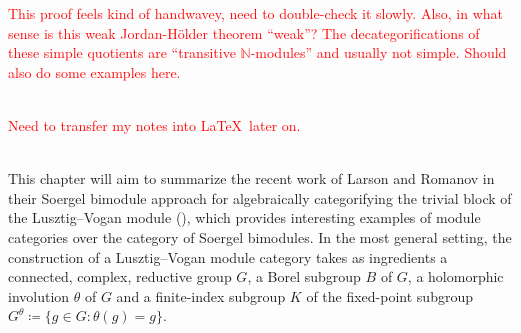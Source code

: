 \noindent\textcolor{red}{This proof feels kind of handwavey, need to double-check it slowly. Also, in what sense is this weak Jordan-H\"{o}lder theorem ``weak''? The decategorifications of these simple quotients are ``transitive $\mathbb{N}$-modules'' and usually not simple. Should also do some examples here.}\\
\newpage

\noindent\\ \textcolor{red}{Need to transfer my notes into \LaTeX\ later on.}
\newpage

\noindent\\ This chapter will aim to summarize the recent work of Larson and Romanov in their Soergel bimodule approach for algebraically categorifying the trivial block of the Lusztig--Vogan module (\cite{LR22}), which provides interesting examples of module categories over the category of Soergel bimodules. In the most general setting, the construction of a Lusztig--Vogan module category takes as ingredients a connected, complex, reductive group $G$, a Borel subgroup $B$ of $G$, a holomorphic involution $\theta$ of $G$ and a finite-index subgroup $K$ of the fixed-point subgroup $G^\theta \coloneqq \{g \in G : \theta(g) = g\}$.\\

